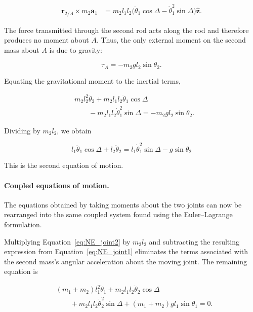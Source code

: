 \begin{align}
    \mathbf{r}_{2/A}\times m_2\mathbf{a}_1
    &=
    m_2l_1l_2
    \Big(
        \ddot{\theta}_1\cos\Delta
        -\dot{\theta}_1^2\sin\Delta
    \Big)\hat{\mathbf{z}}.
\end{align}

The force transmitted through the second rod acts along the rod and therefore produces no moment about \(A\). Thus, the only external moment on the second mass about \(A\) is due to gravity:

\begin{equation}
    \tau_A
    =
    -m_2gl_2\sin\theta_2.
\end{equation}

Equating the gravitational moment to the inertial terms,

\begin{align}
    &m_2l_2^2\ddot{\theta}_2
    +m_2l_1l_2\ddot{\theta}_1\cos\Delta
    \nonumber\\
    &\qquad
    -m_2l_1l_2\dot{\theta}_1^2\sin\Delta
    =
    -m_2gl_2\sin\theta_2.
\end{align}

Dividing by \(m_2l_2\), we obtain

\begin{equation}
    \boxed{
    l_1\ddot{\theta}_1\cos\Delta
    +l_2\ddot{\theta}_2
    =
    l_1\dot{\theta}_1^2\sin\Delta
    -g\sin\theta_2
    }
    \label{eq:NE_joint2}
\end{equation}

This is the second equation of motion.

\paragraph{Coupled equations of motion.}

The equations obtained by taking moments about the two joints can now be rearranged into the same coupled system found using the Euler--Lagrange formulation.

Multiplying Equation~\eqref{eq:NE_joint2} by \(m_2l_2\) and subtracting the resulting expression from Equation~\eqref{eq:NE_joint1} eliminates the terms associated with the second mass's angular acceleration about the moving joint. The remaining equation is

\begin{align}
    &(m_1+m_2)l_1^2\ddot{\theta}_1
    +m_2l_1l_2\ddot{\theta}_2\cos\Delta\nonumber\\
    &\qquad
    +m_2l_1l_2\dot{\theta}_2^2\sin\Delta
    +(m_1+m_2)gl_1\sin\theta_1
    =0.
\end{align}

